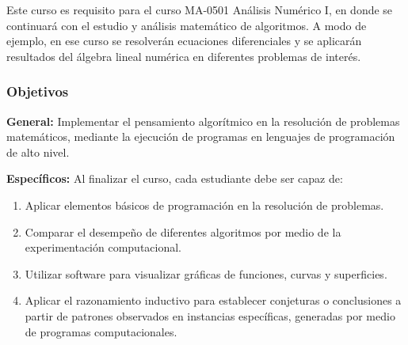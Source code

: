 \begin{refsection}
Este curso es requisito para el curso MA-0501 Análisis Numérico I, en donde se continuará con el estudio y análisis matemático de algoritmos. A modo de ejemplo, en ese curso se resolverán ecuaciones diferenciales y se aplicarán resultados del álgebra lineal numérica en diferentes problemas de interés.


\subsubsection*{Objetivos}

\textbf{General:} 
Implementar el pensamiento algorítmico en la resolución de problemas matemáticos, mediante la ejecución de programas en lenguajes de programación de alto nivel. %

\textbf{Específicos:}
Al finalizar el curso, cada estudiante debe ser capaz de:
\begin{enumerate}
\item Aplicar elementos básicos de programación en la resolución de problemas. 
\item Comparar el desempeño de diferentes algoritmos por medio de la experimentación computacional.
\item Utilizar software para visualizar gráficas de funciones, curvas y superficies.
\item Aplicar el razonamiento inductivo para establecer conjeturas o conclusiones a partir de patrones observados en instancias específicas, generadas por medio de programas computacionales.
 

\end{enumerate}
\end{refsection}
